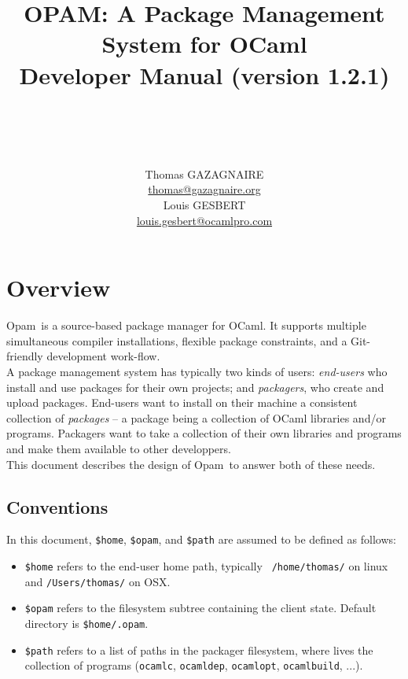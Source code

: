 \documentclass[a4paper,10pt]{article}
\title{
OPAM: A Package Management System for OCaml\\
Developer Manual (version 1.2.1)\\ ~\ \\
~\ \\}
\author{Thomas GAZAGNAIRE\\
\url{thomas@gazagnaire.org}\\
Louis GESBERT\\
\url{louis.gesbert@ocamlpro.com}\\
}
\begin{document}
\newcommand{\OPAM}{{\sc Opam}}

\maketitle

\vfill

\tableofcontents

\section*{Overview}

\OPAM\ is a source-based package manager for OCaml. It supports multiple
simultaneous compiler installations, flexible package constraints, and
a Git-friendly development work-flow.\\

A package management system has typically two kinds of users: {\em
  end-users} who install and use packages for their own projects; and
{\em packagers}, who create and upload packages. End-users want to
install on their machine a consistent collection of {\em packages} --
a package being a collection of OCaml libraries and/or programs.
Packagers want to take a collection of their own libraries and
programs and make them available to other developpers.\\

This document describes the design of \OPAM\ to answer both of these needs.

\subsection*{Conventions}

In this document, \verb+$home+, \verb+$opam+, and
\verb+$path+ are assumed to be defined as follows:

\begin{itemize}

\item {\tt \$home} refers to the end-user home path, typically {\tt
  /home/thomas/} on linux and {\tt /Users/thomas/} on OSX.

\item {\tt \$opam} refers to the filesystem subtree containing the
  client state. Default directory is {\tt \$home/.opam}.

\item {\tt \$path} refers to a list of paths in the packager filesystem, where
  lives the collection of programs ({\tt ocamlc}, {\tt ocamldep}, {\tt ocamlopt},
  {\tt ocamlbuild}, ...).

\end{itemize}
\end{document}
